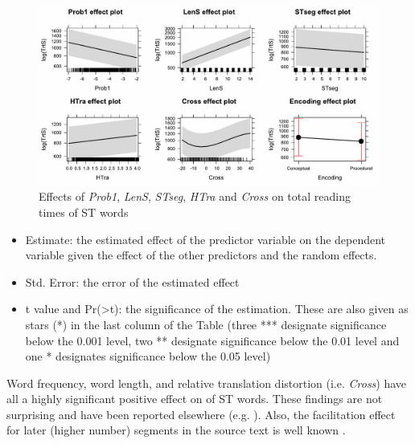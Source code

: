 \documentclass[output=paper]{LSP/langsci}
\begin{document}
\begin{figure}
\includegraphics[width=6.5in,angle=90]{figures/carl-schaefer/TrtS.pdf} 
\caption{Effects of \textit{Prob1}, \textit{LenS}, \textit{STseg}, \textit{HTra} and \textit{Cross} on total reading times of ST words}
\label{carl-schaeffer:fig:trt}
\end{figure}



\begin{itemize}
\item Estimate: the estimated  effect of the predictor variable on the dependent variable given the effect of the other predictors and the random effects. 
\item Std. Error: the error of the estimated effect
\item t value and Pr({\textgreater}{\textbar}t{\textbar}): the significance of the estimation. These are also given as stars (*) in the last column of the Table (three *** designate significance below the 0.001 level, two ** designate significance below the 0.01 level and one * designates significance below the 0.05 level)
\end{itemize}

Word frequency, word length,  and relative translation distortion (i.e. \textit{Cross}) have all a highly significant positive effect on  of ST words. These findings are not surprising and have been reported elsewhere (e.g. \citealt{Schaeffer2014}). Also, the facilitation effect for later (higher number) segments in the source text is well known \citep{Schaeffer2016Word}.

  
\end{document}
